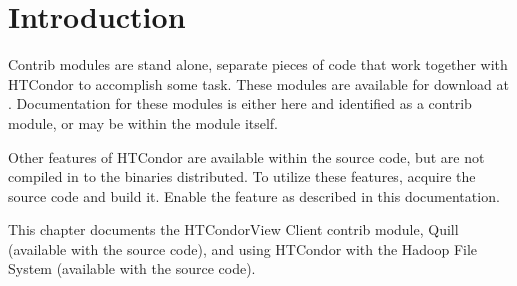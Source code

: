 \section{\label{sec:Contrib-Info}Introduction}

Contrib modules are stand alone, separate pieces of code that work
together with HTCondor to accomplish some task.
These modules are available for download at 
.
Documentation for these modules is either here and identified
as a contrib module, 
or may be within the module itself.

Other features of HTCondor are available within the source code,
but are not compiled in to the binaries distributed.
To utilize these features, 
acquire the source code and build it.
Enable the feature as described in this documentation.

This chapter documents the HTCondorView Client contrib module,
Quill (available with the source code),
and using HTCondor with the Hadoop File System (available with the source code).






